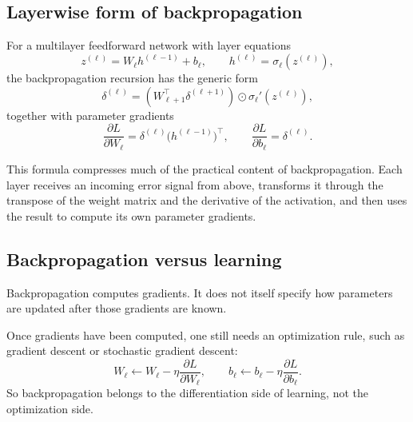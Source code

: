 \subsection*{Layerwise form of backpropagation}

For a multilayer feedforward network with layer equations
\[
z^{(\ell)}=W_\ell h^{(\ell-1)}+b_\ell,
\qquad
h^{(\ell)}=\sigma_\ell(z^{(\ell)}),
\]
the backpropagation recursion has the generic form
\[
\delta^{(\ell)}
=
\left(W_{\ell+1}^\top \delta^{(\ell+1)}\right)\odot \sigma_\ell'(z^{(\ell)}),
\]
together with parameter gradients
\[
\frac{\partial L}{\partial W_\ell}
=
\delta^{(\ell)}\bigl(h^{(\ell-1)}\bigr)^\top,
\qquad
\frac{\partial L}{\partial b_\ell}
=
\delta^{(\ell)}.
\]

This formula compresses much of the practical content of backpropagation. Each layer receives an incoming error signal from above, transforms it through the transpose of the weight matrix and the derivative of the activation, and then uses the result to compute its own parameter gradients.

\subsection*{Backpropagation versus learning}

Backpropagation computes gradients. It does not itself specify how parameters are updated after those gradients are known.

Once gradients have been computed, one still needs an optimization rule, such as gradient descent or stochastic gradient descent:
\[
W_\ell \leftarrow W_\ell - \eta \frac{\partial L}{\partial W_\ell},
\qquad
b_\ell \leftarrow b_\ell - \eta \frac{\partial L}{\partial b_\ell}.
\]
So backpropagation belongs to the differentiation side of learning, not the optimization side.



